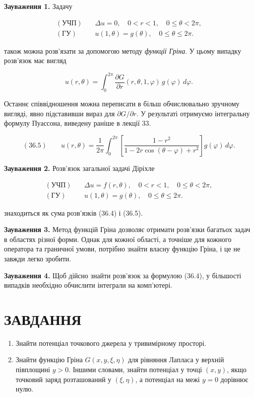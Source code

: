 \documentclass[
  ukrainian,
]{article}
\begin{document}
\textbf{Зауваження 1.} Задачу

\[
\begin{aligned}(\text{УЧП}) \quad & \Delta u = 0, \quad 0 < r < 1, \quad 0 \leqslant \theta < 2\pi, \\(\text{ГУ}) \quad & u(1, \theta) = g(\theta), \quad 0 \leqslant \theta \leqslant 2\pi.\end{aligned}
\]

також можна розв'язати за допомогою методу \emph{функції Гріна}. У цьому
випадку розв'язок має вигляд

\[
u(r, \theta) = \int_{0}^{2\pi} \frac{\partial G}{\partial r}(r, \theta, 1, \varphi)\, g(\varphi)\, d\varphi.
\]

Останнє співвідношення можна переписати в більш обчислювально зручному
вигляді, явно підставивши вираз для \(\partial G/\partial r\). У
результаті отримуємо інтегральну формулу Пуассона, виведену раніше в
лекції 33.

\[
(36.5)\qquad u(r, \theta) = \frac{1}{2\pi} \int_{0}^{2\pi}\left[ \frac{1 - r^2}{1 - 2r\cos(\theta - \varphi) + r^2} \right] g(\varphi)\, d\varphi.
\]

\textbf{Зауваження 2.} Розв'язок загальної задачі Діріхле

\[
\begin{aligned}(\text{УЧП}) \quad & \Delta u = f(r, \theta), \quad 0 < r < 1, \quad 0 \le \theta < 2\pi, \\(\text{ГУ}) \quad & u(1, \theta) = g(\theta), \quad 0 \le \theta \le 2\pi.\end{aligned}
\]

знаходиться як сума розв'язків (36.4) і (36.5).

\textbf{Зауваження 3.} Метод функцій Гріна дозволяє отримати розв'язки
багатьох задач в областях різної форми. Однак для кожної області, а
точніше для кожного оператора та граничної умови, потрібно знайти власну
функцію Гріна, і це не завжди легко зробити.

\textbf{Зауваження 4.} Щоб дійсно знайти розв'язок за формулою (36.4), у
більшості випадків необхідно обчислити інтеграли на комп'ютері.

\section{ЗАВДАННЯ}\label{ux437ux430ux432ux434ux430ux43dux43dux44f-17}

\begin{enumerate}
\def\labelenumi{\arabic{enumi}.}
\item
  Знайти потенціал точкового джерела у тривимірному просторі.
\item
  Знайти функцію Гріна \(G(x,y,\xi,\eta)\) для рівняння Лапласа у
  верхній півплощині \(y>0\). Іншими словами, знайти потенціал у точці
  \((x,y)\), якщо точковий заряд розташований у \((\xi,\eta)\), а
  потенціал на межі \(y=0\) дорівнює нулю.
\end{enumerate}
\end{document}
